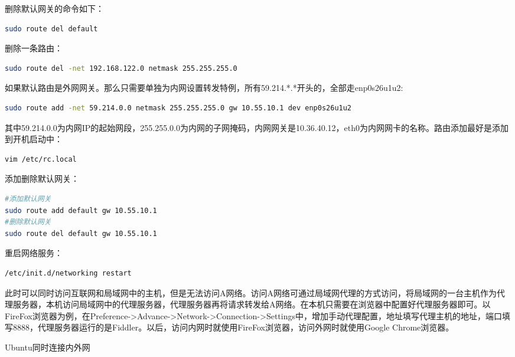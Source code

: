 \documentclass[11pt,fleqn]{book}
\makeatletter
\numberwithin{dummy}{section}
\theoremstyle{ocrenumbox}
\theoremstyle{blacknumex}
\theoremstyle{blacknumbox}
\theoremstyle{ocrenum}
\renewcommand{\subsubsection}{\@startsection {subsubsection}{3}{\z@}
	{-2ex \@plus -0.1ex \@minus -.2ex}
	{.2ex \@plus.2ex }
	{\normalfont\small\sffamily\bfseries}}
\makeatother
\begin{document}
删除默认网关的命令如下：

\begin{lstlisting}[language=Bash]
sudo route del default
\end{lstlisting}

删除一条路由：

\begin{lstlisting}[language=Bash]
sudo route del -net 192.168.122.0 netmask 255.255.255.0
\end{lstlisting}

如果默认路由是外网网关。那么只需要单独为内网设置转发特例，所有59.214.*.*开头的，全部走enp0s26u1u2:

\begin{lstlisting}[language=Bash]
sudo route add -net 59.214.0.0 netmask 255.255.255.0 gw 10.55.10.1 dev enp0s26u1u2
\end{lstlisting}

其中59.214.0.0为内网IP的起始网段，255.255.0.0为内网的子网掩码，内网网关是10.36.40.12，eth0为内网网卡的名称。路由添加最好是添加到开机启动中：

\begin{lstlisting}[language=Bash]
vim /etc/rc.local
\end{lstlisting}

添加删除默认网关：

\begin{lstlisting}[language=Bash]
#添加默认网关
sudo route add default gw 10.55.10.1
#删除默认网关
sudo route del default gw 10.55.10.1
\end{lstlisting}

重启网络服务：

\begin{lstlisting}[language=Bash]
/etc/init.d/networking restart
\end{lstlisting}

此时可以同时访问互联网和局域网中的主机，但是无法访问A网络。访问A网络可通过局域网代理的方式访问，将局域网的一台主机作为代理服务器，本机访问局域网中的代理服务器，代理服务器再将请求转发给A网络。在本机只需要在浏览器中配置好代理服务器即可。以FireFox浏览器为例，在Preference->Advance->Network->Connection->Settings中，增加手动代理配置，地址填写代理主机的地址，端口填写8888，代理服务器运行的是Fiddler。以后，访问内网时就使用FireFox浏览器，访问外网时就使用Google Chrome浏览器。


\subsubsection{Ubuntu同时连接内外网}
\end{document}
